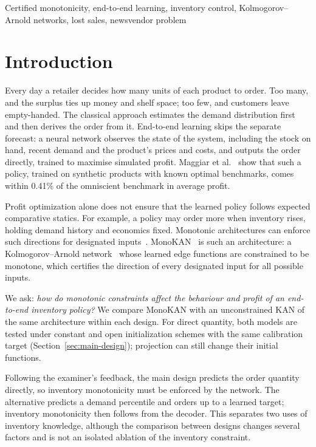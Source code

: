 \documentclass[conference]{IEEEtran}
\begin{document}
\begin{IEEEkeywords}
Certified monotonicity, end-to-end learning, inventory control, Kolmogorov--Arnold networks, lost sales,
newsvendor problem
\end{IEEEkeywords}

\section{Introduction}\label{sec:intro}
Every day a retailer decides how many units of each product to order. Too many, and the surplus ties up money and
shelf space; too few, and customers leave empty-handed. The classical approach estimates the demand distribution first
and then derives the order from it. End-to-end learning skips the separate forecast: a neural network observes the
state of the system, including the stock on hand, recent demand and the product's prices and costs, and outputs the
order directly, trained to maximise simulated profit. Maggiar et al.~\cite{maggiar2025} show that such a policy,
trained on synthetic products with known optimal benchmarks, comes within 0.41\% of the
omniscient benchmark in average profit.

Profit optimization alone does not ensure that the learned policy follows expected comparative statics. For example,
a policy may order more when inventory rises, holding demand history and economics fixed. Monotonic architectures
can enforce such directions for designated inputs~\cite{sill1998,you2017}.
MonoKAN~\cite{polomolina2024} is such an architecture: a Kolmogorov--Arnold network~\cite{liu2024} whose learned edge
functions are constrained to be monotone, which certifies the direction of every designated input for all possible
inputs.

We ask: \emph{how do monotonic constraints affect the behaviour and profit of an end-to-end inventory policy?}
We compare MonoKAN with an unconstrained KAN of the same architecture within each design. For direct quantity,
both models are tested under constant and open initialization schemes with the same calibration target
(Section~\ref{sec:main-design}); projection can still change their initial functions.

Following the examiner's feedback, the main design predicts the order quantity directly, so inventory monotonicity
must be enforced by the network. The alternative predicts a demand percentile and orders up to a learned target;
inventory monotonicity then follows from the decoder. This separates two uses of inventory knowledge, although the
comparison between designs changes several factors and is not an isolated ablation of the inventory constraint.
\end{document}
